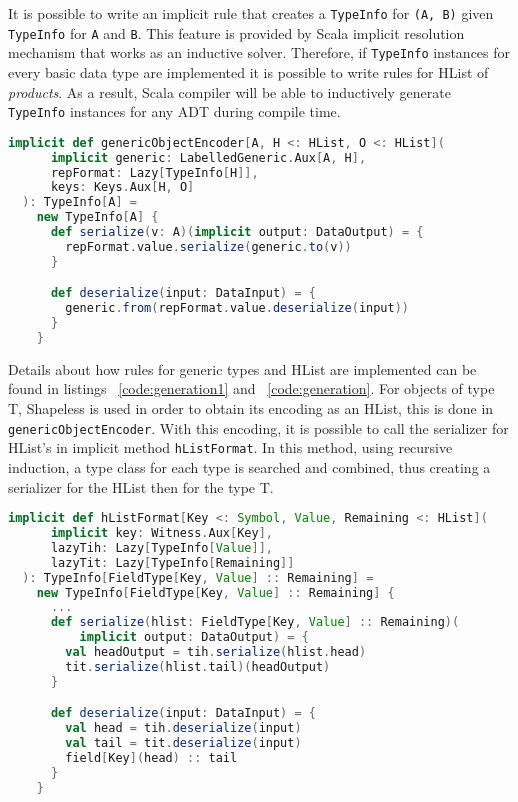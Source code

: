 It is possible to write an implicit rule that creates a
\lstinline[columns=fixed]{TypeInfo} for \lstinline[columns=fixed]{(A, B)} given
\lstinline[columns=fixed]{TypeInfo} for \lstinline[columns=fixed]{A} and
\lstinline[columns=fixed]{B}. This feature is provided by Scala implicit
resolution mechanism that works as an inductive solver. Therefore, if
\lstinline[columns=fixed]{TypeInfo} instances for every basic data type are
implemented it is possible to write rules for \acs{HList} of
\textit{products}. As a result, Scala compiler will be able to inductively
generate \lstinline[columns=fixed]{TypeInfo} instances for any \acs{ADT}
during compile time.

\begin{lstlisting}[language=scala, frame=trBL, label=code:generation1, float=ht, caption = {Serializer Deserializer typeclass}]
  implicit def genericObjectEncoder[A, H <: HList, O <: HList](
      implicit generic: LabelledGeneric.Aux[A, H],
      repFormat: Lazy[TypeInfo[H]],
      keys: Keys.Aux[H, O]
  ): TypeInfo[A] =
    new TypeInfo[A] {
      def serialize(v: A)(implicit output: DataOutput) = {
        repFormat.value.serialize(generic.to(v))
      }

      def deserialize(input: DataInput) = {
        generic.from(repFormat.value.deserialize(input))
      }
    }
\end{lstlisting}

Details about how rules for generic types and \acs{HList} are implemented can be
found in listings ~\ref{code:generation1} and ~\ref{code:generation}. For
objects of type T, Shapeless is used in order to obtain its encoding as an
\acs{HList}, this is done in \lstinline[columns=fixed]{genericObjectEncoder}.
With this encoding, it is possible to call the serializer for \acs{HList}'s in
implicit method \lstinline[columns=fixed]{hListFormat}. In this method, using
recursive induction, a type class for each type is searched and combined, thus
creating a serializer for the \acs{HList} then for the type T.

\begin{lstlisting}[language=scala, frame=trBL, label=code:generation, float=ht, caption = {Serializer Deserializer typeclass}]
  implicit def hListFormat[Key <: Symbol, Value, Remaining <: HList](
      implicit key: Witness.Aux[Key],
      lazyTih: Lazy[TypeInfo[Value]],
      lazyTit: Lazy[TypeInfo[Remaining]]
  ): TypeInfo[FieldType[Key, Value] :: Remaining] =
    new TypeInfo[FieldType[Key, Value] :: Remaining] {
      ...
      def serialize(hlist: FieldType[Key, Value] :: Remaining)(
          implicit output: DataOutput) = {
        val headOutput = tih.serialize(hlist.head)
        tit.serialize(hlist.tail)(headOutput)
      }

      def deserialize(input: DataInput) = {
        val head = tih.deserialize(input)
        val tail = tit.deserialize(input)
        field[Key](head) :: tail
      }
    }
\end{lstlisting}

